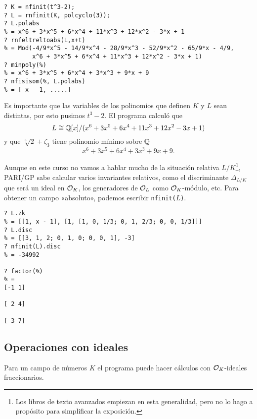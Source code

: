 \begin{shaded}
\begin{verbatim}
? K = nfinit(t^3-2);
? L = rnfinit(K, polcyclo(3));
? L.polabs
% = x^6 + 3*x^5 + 6*x^4 + 11*x^3 + 12*x^2 - 3*x + 1
? rnfeltreltoabs(L,x+t)
% = Mod(-4/9*x^5 - 14/9*x^4 - 28/9*x^3 - 52/9*x^2 - 65/9*x - 4/9,
        x^6 + 3*x^5 + 6*x^4 + 11*x^3 + 12*x^2 - 3*x + 1)
? minpoly(%)
% = x^6 + 3*x^5 + 6*x^4 + 3*x^3 + 9*x + 9
? nfisisom(%, L.polabs)
% = [-x - 1, .....]
\end{verbatim}
\end{shaded}

Es importante que las variables de los polinomios que definen $K$ y $L$ sean
distintas, por esto pusimos $t^3 - 2$. El programa calculó que
$$L \cong \mathbb{Q}[x]/(x^6 + 3 x^5 + 6 x^4 + 11 x^3 + 12 x^2 - 3 x + 1)$$
y que $\sqrt[3]{2} + \zeta_3$ tiene polinomio mínimo sobre $\mathbb{Q}$
$$x^6 + 3 x^5 + 6 x^4 + 3 x^3 + 9 x + 9.$$

Aunque en este curso no vamos a hablar mucho de la situación relativa
$L/K$\footnote{Los libros de texto avanzados empiezan en esta generalidad, pero
  no lo hago a propósito para simplificar la exposición.}, PARI/GP sabe calcular
varios invariantes relativos, como el discriminante $\Delta_{L/K}$ que será un
ideal en $\mathcal{O}_K$, los generadores de $\mathcal{O}_L$ como $\mathcal{O}_K$-módulo, etc. Para obtener
un campo «absoluto», podemos escribir \texttt{nfinit($L$)}.

\begin{shaded}
\begin{verbatim}
? L.zk
% = [[1, x - 1], [1, [1, 0, 1/3; 0, 1, 2/3; 0, 0, 1/3]]]
? L.disc
% = [[3, 1, 2; 0, 1, 0; 0, 0, 1], -3]
? nfinit(L).disc
% = -34992

? factor(%)
% = 
[-1 1]

[ 2 4]

[ 3 7]
\end{verbatim}
\end{shaded}


\subsection{Operaciones con ideales}

Para un campo de números $K$ el programa puede hacer cálculos con $\mathcal{O}_K$-ideales
fraccionarios.

